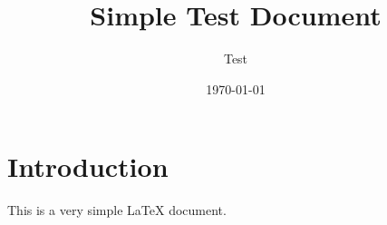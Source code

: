 \documentclass{article}
\title{Simple Test Document}
\author{Test}
\date{\today}
\begin{document}
\maketitle

\section{Introduction}
This is a very simple LaTeX document.
\end{document}
